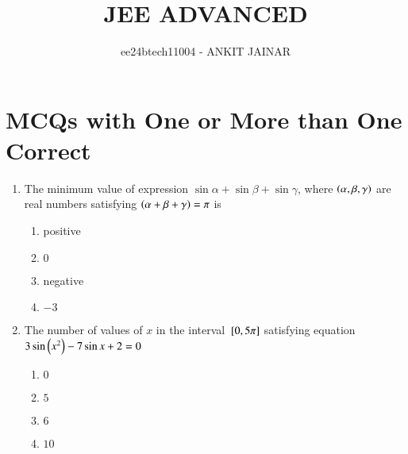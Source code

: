 \documentclass[journal,12pt,onecolumn]{IEEEtran}
\theoremstyle{remark}
\begin{document}

\vspace{3cm}

\title{JEE ADVANCED}
\author{ee24btech11004 - ANKIT JAINAR}
\maketitle

\bigskip

\renewcommand{\thefigure}{\theenumi}
\renewcommand{\thetable}{\theenumi}
\section{MCQs with One or More than One Correct}
\begin{enumerate}
\item The minimum value of expression $\sin{\alpha} + \sin{\beta} + \sin{\gamma}$, where $\left(\alpha,\beta,\gamma\right)$ are real numbers satisfying $\left(\alpha+\beta+\gamma\right)=\pi$  is \hfill{}
\begin{enumerate}
    \item positive
    \item $0$
    \item negative 
    \item $-3$
\end{enumerate}
\item The number of values of $x$ in the interval ${}\left[0,5\pi\right]$ satisfying equation \\$3 \sin{\ensuremath{\left(x^2\right)}}-7 \sin{x+2}=0$  \hfill{} 
\begin{enumerate}
    \item $0$
    \item $5$
    \item $6$
    \item $10$
\end{enumerate}


\end{enumerate}
\end{document}
